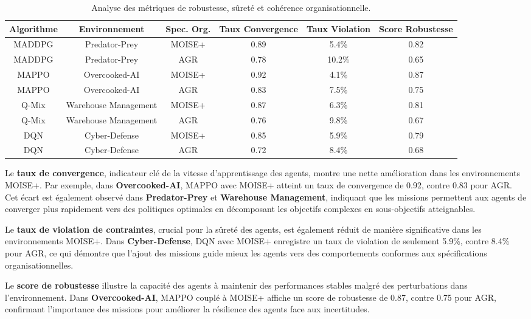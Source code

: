 \documentclass[sigconf,anonymous]{aamas}
\begin{document}
\begin{table*}[h!]
    \centering
    \caption{Analyse des métriques de robustesse, sûreté et cohérence organisationnelle.}
    \label{tab:other_metrics}
    \begin{tabular}{|c|c|c|c|c|c|}
        \hline
        \textbf{Algorithme} & \textbf{Environnement} & \textbf{Spec. Org.} & \textbf{Taux Convergence} & \textbf{Taux Violation} & \textbf{Score Robustesse} \\ \hline
        MADDPG & Predator-Prey & MOISE+ & 0.89 & 5.4\% & 0.82 \\ \hline
        MADDPG & Predator-Prey & AGR & 0.78 & 10.2\% & 0.65 \\ \hline
        MAPPO & Overcooked-AI & MOISE+ & 0.92 & 4.1\% & 0.87 \\ \hline
        MAPPO & Overcooked-AI & AGR & 0.83 & 7.5\% & 0.75 \\ \hline
        Q-Mix & Warehouse Management & MOISE+ & 0.87 & 6.3\% & 0.81 \\ \hline
        Q-Mix & Warehouse Management & AGR & 0.76 & 9.8\% & 0.67 \\ \hline
        DQN & Cyber-Defense & MOISE+ & 0.85 & 5.9\% & 0.79 \\ \hline
        DQN & Cyber-Defense & AGR & 0.72 & 8.4\% & 0.68 \\ \hline
    \end{tabular}
\end{table*}

Le \textbf{taux de convergence}, indicateur clé de la vitesse d'apprentissage des agents, montre une nette amélioration dans les environnements MOISE+. Par exemple, dans \textbf{Overcooked-AI}, MAPPO avec MOISE+ atteint un taux de convergence de 0.92, contre 0.83 pour AGR. Cet écart est également observé dans \textbf{Predator-Prey} et \textbf{Warehouse Management}, indiquant que les missions permettent aux agents de converger plus rapidement vers des politiques optimales en décomposant les objectifs complexes en sous-objectifs atteignables.

Le \textbf{taux de violation de contraintes}, crucial pour la sûreté des agents, est également réduit de manière significative dans les environnements MOISE+. Dans \textbf{Cyber-Defense}, DQN avec MOISE+ enregistre un taux de violation de seulement 5.9\%, contre 8.4\% pour AGR, ce qui démontre que l'ajout des missions guide mieux les agents vers des comportements conformes aux spécifications organisationnelles.

Le \textbf{score de robustesse} illustre la capacité des agents à maintenir des performances stables malgré des perturbations dans l'environnement. Dans \textbf{Overcooked-AI}, MAPPO couplé à MOISE+ affiche un score de robustesse de 0.87, contre 0.75 pour AGR, confirmant l'importance des missions pour améliorer la résilience des agents face aux incertitudes.
\end{document}
